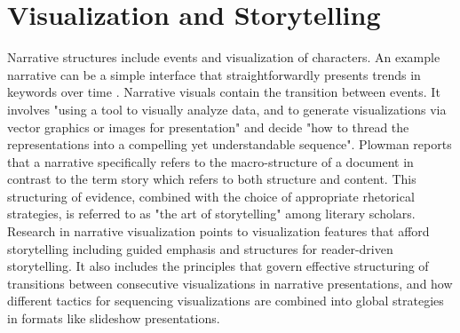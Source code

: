 \documentclass{egpubl}
\begin{document}
\section{Visualization and Storytelling}
Narrative structures include events and visualization of characters. An example narrative can be a simple interface that straightforwardly presents trends in keywords over time \cite{fisher}. Narrative visuals contain the transition between events. It involves "using a tool to visually analyze data, and to generate visualizations via vector graphics or images for presentation" and decide "how to thread the representations into a compelling yet understandable sequence"\cite{hullman2013deeper}. Plowman \cite{plowman1999,eccles2007} reports that a narrative specifically refers to the macro-structure of a document in contrast to the term story which refers to both structure and content. This structuring of evidence, combined with the choice of appropriate rhetorical strategies, is referred to as "the art of storytelling" among literary scholars. Research in narrative visualization points to visualization features that afford storytelling including guided emphasis and structures for reader-driven storytelling. It also includes the principles that govern effective structuring of transitions
between consecutive visualizations in narrative presentations, and how different tactics for sequencing visualizations are combined into global strategies in formats like slideshow presentations.
\end{document}

